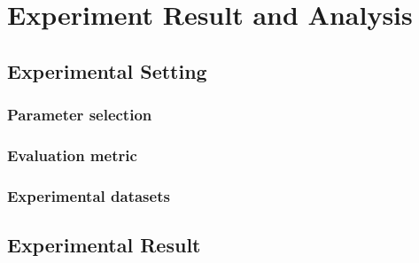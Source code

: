 \chapter{Experiment Result and Analysis}
\label{Chapter4}
\section{Experimental Setting}
\subsection{Parameter selection}
\subsection{Evaluation metric}
\subsection{Experimental datasets}
\section{Experimental Result}
